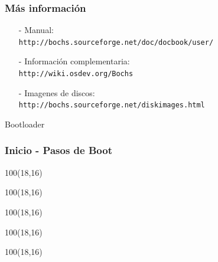 \documentclass[aspectratio=169]{beamer}
\begin{document}
\begin{frame}
    \frametitle{Más información}
    \begin{itemize}
    \item[-] \textcolor{verdeuca}{Manual:}\\ \texttt{http://bochs.sourceforge.net/doc/docbook/user/}
    \vspace{0.2cm}
    \item[-] \textcolor{verdeuca}{Información complementaria:}\\ \texttt{http://wiki.osdev.org/Bochs}
    \vspace{0.2cm}
    \item[-] \textcolor{verdeuca}{Imagenes de discos:}\\ \texttt{http://bochs.sourceforge.net/diskimages.html}
    \end{itemize}
\end{frame}

\begin{frame}
    \Huge Bootloader
\end{frame}

\begin{frame}
    \frametitle{Inicio - Pasos de Boot}
    \begin{textblock}{100}(18,16)
    \end{textblock}
    \begin{textblock}{100}(18,16)
    \end{textblock}
    \begin{textblock}{100}(18,16)
    \end{textblock}
    \begin{textblock}{100}(18,16)
    \end{textblock}
    \begin{textblock}{100}(18,16)
    \end{textblock}
\end{frame}
\end{document}
